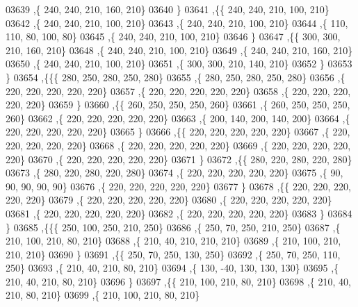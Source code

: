\begin{DoxyCode}
03639     ,\{   240,   240,   210,   160,   210\}
03640     \}
03641    ,\{\{   240,   240,   210,   100,   210\}
03642     ,\{   240,   240,   210,   100,   210\}
03643     ,\{   240,   240,   210,   100,   210\}
03644     ,\{   110,   110,    80,   100,    80\}
03645     ,\{   240,   240,   210,   100,   210\}
03646     \}
03647    ,\{\{   300,   300,   210,   160,   210\}
03648     ,\{   240,   240,   210,   100,   210\}
03649     ,\{   240,   240,   210,   160,   210\}
03650     ,\{   240,   240,   210,   100,   210\}
03651     ,\{   300,   300,   210,   140,   210\}
03652     \}
03653    \}
03654   ,\{\{\{   280,   250,   280,   250,   280\}
03655     ,\{   280,   250,   280,   250,   280\}
03656     ,\{   220,   220,   220,   220,   220\}
03657     ,\{   220,   220,   220,   220,   220\}
03658     ,\{   220,   220,   220,   220,   220\}
03659     \}
03660    ,\{\{   260,   250,   250,   250,   260\}
03661     ,\{   260,   250,   250,   250,   260\}
03662     ,\{   220,   220,   220,   220,   220\}
03663     ,\{   200,   140,   200,   140,   200\}
03664     ,\{   220,   220,   220,   220,   220\}
03665     \}
03666    ,\{\{   220,   220,   220,   220,   220\}
03667     ,\{   220,   220,   220,   220,   220\}
03668     ,\{   220,   220,   220,   220,   220\}
03669     ,\{   220,   220,   220,   220,   220\}
03670     ,\{   220,   220,   220,   220,   220\}
03671     \}
03672    ,\{\{   280,   220,   280,   220,   280\}
03673     ,\{   280,   220,   280,   220,   280\}
03674     ,\{   220,   220,   220,   220,   220\}
03675     ,\{    90,    90,    90,    90,    90\}
03676     ,\{   220,   220,   220,   220,   220\}
03677     \}
03678    ,\{\{   220,   220,   220,   220,   220\}
03679     ,\{   220,   220,   220,   220,   220\}
03680     ,\{   220,   220,   220,   220,   220\}
03681     ,\{   220,   220,   220,   220,   220\}
03682     ,\{   220,   220,   220,   220,   220\}
03683     \}
03684    \}
03685   ,\{\{\{   250,   100,   250,   210,   250\}
03686     ,\{   250,    70,   250,   210,   250\}
03687     ,\{   210,   100,   210,    80,   210\}
03688     ,\{   210,    40,   210,   210,   210\}
03689     ,\{   210,   100,   210,   210,   210\}
03690     \}
03691    ,\{\{   250,    70,   250,   130,   250\}
03692     ,\{   250,    70,   250,   110,   250\}
03693     ,\{   210,    40,   210,    80,   210\}
03694     ,\{   130,   -40,   130,   130,   130\}
03695     ,\{   210,    40,   210,    80,   210\}
03696     \}
03697    ,\{\{   210,   100,   210,    80,   210\}
03698     ,\{   210,    40,   210,    80,   210\}
03699     ,\{   210,   100,   210,    80,   210\}

\end{DoxyCode}
